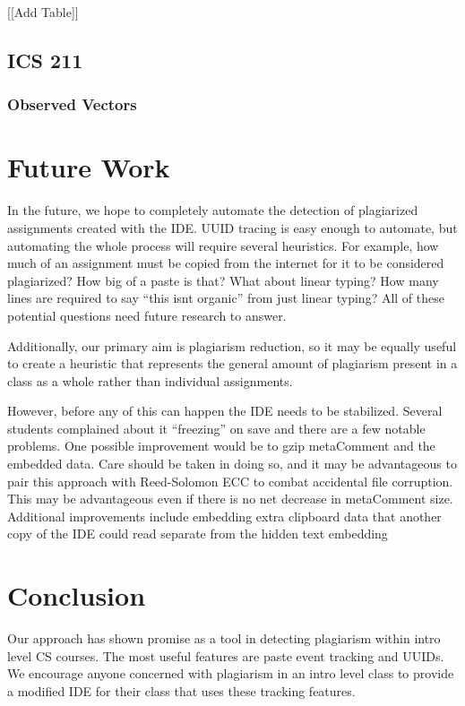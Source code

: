 \documentclass[letterpaper,10pt,conference]{IEEEtran}
\newcommand{\metaComment}{metaComment\xspace}
\begin{document}
[[Add Table]]
\subsection{ICS 211}

\subsubsection{Observed Vectors}

\section{Future Work}
In the future, we hope to completely automate the detection of plagiarized assignments created with the IDE.  UUID tracing is easy enough to automate, but automating the whole process will require several heuristics.  For example, how much of an assignment must be copied from the internet for it to be considered plagiarized?  How big of a paste is that?  What about linear typing?  How many lines are required to say ``this isnt organic'' from just linear typing?  All of these potential questions need future research to answer.  

Additionally, our primary aim is plagiarism reduction, so it may be equally useful to create a heuristic that represents the general amount of plagiarism present in a class as a whole rather than individual assignments. 

However, before any of this can happen the IDE needs to be stabilized.  Several students complained about it ``freezing'' on save and there are a few notable problems.  One possible improvement would be to gzip \metaComment and the embedded data.  Care should be taken in doing so, and it may be advantageous to pair this approach with Reed-Solomon ECC to combat accidental file corruption.  This may be advantageous even if there is no net decrease in \metaComment size.  Additional improvements include embedding extra clipboard data that another copy of the IDE could read separate from the hidden text embedding
\section{Conclusion}
Our approach has shown promise as a tool in detecting plagiarism within intro level CS courses.  The most useful features are paste event tracking and UUIDs.  We encourage anyone concerned with plagiarism in an intro level class to provide a modified IDE for their class that uses these tracking features.









\end{document}
